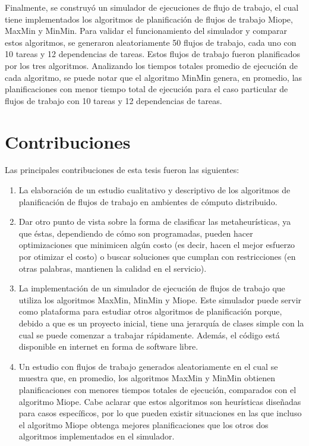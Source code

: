 Finalmente, se construyó un simulador de ejecuciones de flujo de trabajo, el cual tiene implementados los algoritmos de planificación de flujos de trabajo Miope, MaxMin y MinMin. Para validar el funcionamiento del simulador y comparar estos algoritmos, se generaron aleatoriamente 50 flujos de trabajo, cada uno con 10 tareas y 12 dependencias de tareas. Estos flujos de trabajo fueron planificados por los tres algoritmos. Analizando los tiempos totales promedio de ejecución de cada algoritmo, se puede notar que el algoritmo MinMin genera, en promedio, las planificaciones con menor tiempo total de ejecución para el caso particular de flujos de trabajo con 10 tareas y 12 dependencias de tareas.

\section{Contribuciones}
Las principales contribuciones de esta tesis fueron las siguientes:
\begin{enumerate}
\item La elaboración de un estudio cualitativo y descriptivo de los algoritmos de planificación de flujos de trabajo en ambientes de cómputo distribuido.
\item Dar otro punto de vista sobre la forma de clasificar las metaheurísticas, ya que éstas, dependiendo de cómo son programadas, pueden hacer optimizaciones que minimicen algún costo (es decir, hacen el mejor esfuerzo por otimizar el costo) o buscar soluciones que cumplan con restricciones (en otras palabras, mantienen la calidad en el servicio).
\item La implementación de un simulador de ejecución de flujos de trabajo que utiliza los algoritmos MaxMin, MinMin y Miope. Este simulador puede servir como plataforma para estudiar otros algoritmos de planificación porque, debido a que es un proyecto inicial, tiene una jerarquía de clases simple con la cual se puede comenzar a trabajar rápidamente. Además, el código está disponible en internet en forma de software libre.
\item Un estudio con flujos de trabajo generados aleatoriamente en el cual se muestra que, en promedio, los algoritmos MaxMin y MinMin obtienen planificaciones con menores tiempos totales de ejecución, comparados con el algoritmo Miope. Cabe aclarar que estos algoritmos son heurísticas diseñadas para casos específicos, por lo que pueden existir situaciones en las que incluso el algoritmo Miope obtenga mejores planificaciones que los otros dos algoritmos implementados en el simulador.
\end{enumerate}

